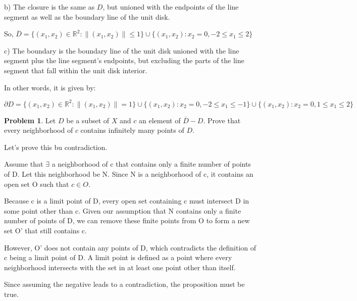 \documentclass{amsart}
\theoremstyle{definition}
\newtheorem{xca}{Problem}
\newcommand{\R}{\mathbb{R}}
\newcommand{\cl}{\overline}
\newcommand{\norm}[1]{\lVert#1\rVert}
\newcommand{\lskip}{\newpage}
\begin{document}
b) The closure is the same as $D$, but unioned with the endpoints of the line segment
as well as the boundary line of the unit disk.

So, $\cl{D} = \{(x_1,x_2)\in \R^2:  \norm{(x_1, x_2)} \leq 1\}\cup \{(x_1,x_2):x_2 = 0, -2 \leq x_1 \leq 2\}$

c) The boundary is the boundary line of the unit disk unioned with the line segment
plus the line segment's endpoints, but excluding the parts of the line segment that fall
within the unit disk interior.

In other words, it is given by:

$\partial{D} = \{(x_1,x_2)\in \R^2:  \norm{(x_1, x_2)} = 1\} \cup \{(x_1,x_2):x_2=0, -2 \leq x_1 \leq -1\} \cup \{(x_1,x_2):x_2=0, 1 \leq x_1 \leq 2\}$



\lskip





\begin{xca}
Let $D$ be a subset of $X$ and $c$ an element of $\cl{D}-D$. Prove that every neighborhood of $c$ contains infinitely many points of $D$.
\end{xca}

Let's prove this bu contradiction.

Assume that $\exists$ a neighborhood of c that contains only a finite number of
points of D. Let this neighborhood be N. Since N is a neighborhood of c, it contains an
open set O such that $c \in O$.

Because c is a limit point of D, every open set containing c must intersect D
in some point other than c. Given our assumption that N contains only a finite number
of points of D, we can remove these finite points from O to form a new set O' that
still contains c.

However, O' does not contain any points of D, which contradicts the definition of c
being a limit point of D. A limit point is defined as a point where every neighborhood
intersects with the set in at least one point other than itself.

Since assuming the negative leads to a contradiction, the proposition must be true.

\lskip
\end{document}
